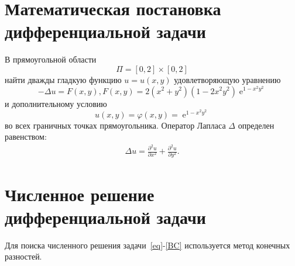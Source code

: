 \documentclass[11pt]{article}
\numberwithin{equation}{section}
\theoremstyle{plain}
\theoremstyle{definition}
\DeclareMathOperator{\expon}{e}
\begin{document}
\setcounter{page}{2}

\tableofcontents
\newpage

\section{Математическая постановка дифференциальной задачи}
В прямоугольной области
\[\Pi = [0,2]\times[0,2]\]
найти дважды гладкую функцию \(u = u(x,y)\) удовлетворяющую уравнению
\begin{equation}
\label{eq}
    -\Delta u = F(x,y), F(x,y) = 2(x^2+y^2)(1-2x^2y^2)\expon^{1-x^2y^2}
\end{equation}
и дополнительному условию
\begin{equation}
\label{BC}
    u(x,y) = \varphi(x,y) = \expon^{1-x^2y^2}
\end{equation}
во всех граничных точках прямоугольника. Оператор Лапласа \(\Delta\) определен равенством:
\[\begin{aligned}
    \Delta u = \frac{\partial^2u}{\partial x^2} + \frac{\partial^2u}{\partial y^2}.
\end{aligned}\]

\section{Численное решение дифференциальной задачи}
Для поиска численного решения задачи~\eqref{eq}-\eqref{BC} используется метод конечных разностей.
\end{document}
